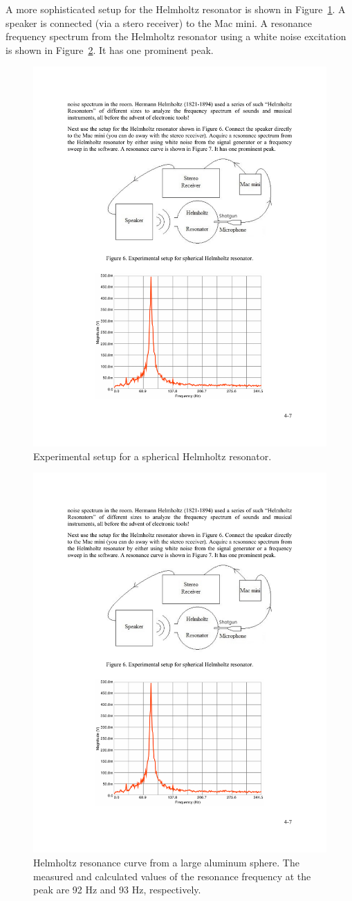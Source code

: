 \documentclass[11pt]{NSF}
\begin{document}
A more sophisticated setup for the Helmholtz resonator is 
shown in Figure~\ref{f:6}.
A speaker is connected (via a stero receiver) to the Mac mini.
A resonance frequency spectrum from the Helmholtz resonator
using a white noise excitation is shown in Figure~\ref{f:7}.
It has one prominent peak.
%
\begin{figure}[hbtp]
\begin{center}
\includegraphics[width=.65\textwidth]{fig4_6}
\caption{Experimental setup for a spherical Helmholtz resonator.}
\label{f:6} 
\end{center} 
\end{figure}
%
%
\begin{figure}[hbtp]
\begin{center}
\includegraphics[width=.7\textwidth]{fig4_7}
\caption{Helmholtz resonance curve from a large aluminum sphere. The measured
and calculated values of the resonance frequency at the peak are 92 Hz and 93
Hz, respectively.}
\label{f:7} 
\end{center} 
\end{figure}
%
\end{document}
